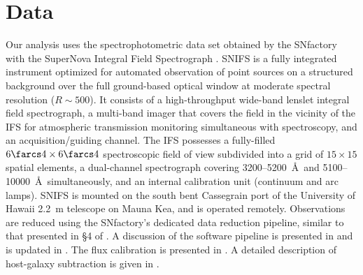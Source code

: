 \documentclass[trackchanges]{aastex62}   	%
\begin{document}
\section{Data}
\label{data:sec}

Our analysis uses the spectrophotometric data set obtained by
the SNfactory with the SuperNova Integral Field
Spectrograph \citep[SNIFS,][]{2002SPIE.4836...61A, 2004SPIE.5249..146L}.  SNIFS is a fully integrated
instrument optimized for automated observation of point sources on a
structured background over the full ground-based optical window at
moderate spectral resolution ($R \sim 500$).  It consists of a
high-throughput wide-band lenslet integral field spectrograph, a multi-band
imager that covers the field in the vicinity of
the IFS for atmospheric transmission monitoring simultaneous with
spectroscopy, and an acquisition/guiding channel.  The IFS possesses a
fully-filled $6\farcs 4 \times 6\farcs 4$ spectroscopic field of view
subdivided into a grid of $15 \times 15$ spatial elements, a
dual-channel spectrograph covering 3200--5200~\AA\ and 5100--10000~\AA\
simultaneously, and an internal calibration unit (continuum and arc
lamps).  SNIFS is mounted on the south bent Cassegrain port of the
University of Hawaii 2.2~m telescope on Mauna Kea, and is operated
remotely.  Observations are reduced using the SNfactory's dedicated data
reduction pipeline, similar to that presented in \S4 of \citet{2001MNRAS.326...23B}.
A discussion of the software pipeline is presented in
\citet{2006ApJ...650..510A} and is updated in \citet{2010ApJ...713.1073S}. 
The flux calibration is presented in \citet{2013A&A...549A...8B}.
A detailed
description of host-galaxy subtraction is given in \citet{2011MNRAS.418..258B}.
\end{document}
